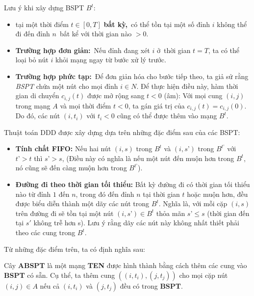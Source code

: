 \documentclass[../main.tex]{subfiles}
\begin{document}
Lưu ý khi xây dựng BSPT \(B^t\):

\begin{itemize}
\tightlist
\item
  tại một thời điểm \(t \in [0, T]\) \textbf{bất kỳ,}~có thể tồn tại một
  số đỉnh \(i\) không thể đi đến đỉnh \(n\)~bất kể với thời gian nào
  \(> 0\).
\item
  \textbf{Trường hợp đơn giản:}~Nếu đỉnh đang xét \(i\) ở~thời gian
  \(t = T\), ta có thể loại bỏ nút \(i\) khỏi mạng ngay từ bước xử lý
  trước.
\item
  \textbf{Trường hợp phức tạp:}~Để đơn giản hóa cho bước tiếp theo, ta
  giả sử rằng \emph{BSPT} chứa một nút cho mọi đỉnh \(i \in N\). Để thực
  hiện điều này, hàm thời gian di chuyển \(c_{i,j}(t)\) được mở rộng
  sang \(t < 0\) (âm): Với mọi cung \((i, j)\) trong mạng \(A\) và mọi
  thời điểm \(t < 0\), ta gán giá trị của \(c_{i,j}(t) = c_{i,j}(0)\).
  Do đó, các nút \((i, t_i)\) với \(t_i<0\) cũng có thể được thêm vào
  mạng \(B^t\).
\end{itemize}

Thuật toán DDD được xây dựng dựa trên những đặc điểm sau của các BSPT: 
\begin{itemize}
  \tightlist
  \item
    \textbf{Tính chất FIFO:} Nếu hai nút \((i, s)\) trong \(B^t\) và
    \((i, s’)\) trong \(B^{t’}\) với \(t’ > t\) thì \(s’ > s\), (Điều này
    có nghĩa là nếu một nút đến muộn hơn trong \(B^t\), nó cũng sẽ đến
    càng muộn hơn trong \(B^{t’}\)).
  \item
    \textbf{Đường đi theo thời gian tối thiểu:} Bất kỳ đường đi có thời
    gian tối thiểu nào từ đỉnh \(1\) đến \(n\), trong đó đến đỉnh \(n\)
    tại thời gian \(t\) hoặc muộn hơn, đều được biểu diễn thành một dãy
    các nút trong \(B^t\). Nghĩa là, với mỗi cặp \((i, s)\) trên đường đi
    sẽ tồn tại một nút \((i, s’) \in B^t\) thỏa mãn \(s’ \le s\) (thời
    gian đến tại \(s'\) không trễ hơn s). Lưu ý rằng dãy các nút này không
    nhất thiết phải theo các cung trong \(B^t\).
  \end{itemize}

Từ những đặc điểm trên, ta có định nghĩa sau:

\begin{definition}
\label{def:abspt}  
Cây \textbf{ABSPT} là một mạng \textbf{TEN} được hình thành bằng cách
thêm các cung vào \textbf{BSPT} có sẵn. Cụ thể, ta thêm cung
\(((i, t_i), (j, t_j))\) cho mọi cặp nút \((i, j) \in A\) nếu cả
\((i, t_i)\) và \((j, t_j)\) đều có trong \textbf{BSPT}. 
\end{definition}
\end{document}

